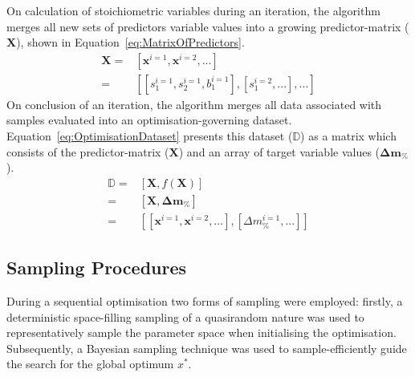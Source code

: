 On calculation of stoichiometric variables during an iteration, the
 algorithm merges all new sets of predictors variable values into a growing
 predictor-matrix (\(\mathbf{X}\)), shown in Equation~\ref{eq:MatrixOfPredictors}.
\begin{equation}\label{eq:MatrixOfPredictors}
    \begin{split}
        \mathbf{X}=&[\mathbf{x}^{i=1},\mathbf{x}^{i=2},...]\\
        =&[[s_{1}^{i=1},s_{2}^{i=1},b_{1}^{i=1}],[s_{1}^{i=2},...],...]
    \end{split}
\end{equation}
On conclusion of an iteration, the algorithm merges all data associated
 with samples evaluated into an optimisation-governing dataset.
Equation~\ref{eq:OptimisationDataset} presents this dataset (\(\mathbb{D}\))
 as a matrix which consists of the predictor-matrix (\(\mathbf{X}\)) and
 an array of target variable
 values (\(\mathbf{\Delta m_{\%}}\)).
\begin{equation}\label{eq:OptimisationDataset}
    \begin{split}
        \mathbb{D}=&[\mathbf{X},f(\mathbf{X})]\\
        =&[\mathbf{X},\mathbf{\Delta m_{\%}}]\\
        =&[[\mathbf{x}^{i=1},\mathbf{x}^{i=2},...],[\Delta m_{\%}^{i=1},...]]
    \end{split}
\end{equation}
\subsection{Sampling Procedures}
During a sequential optimisation two forms of sampling were employed: 
 firstly, a deterministic space-filling sampling of a quasirandom nature was
 used to representatively sample the parameter space when initialising the
 optimisation.
Subsequently, a Bayesian sampling technique was used to sample-efficiently
 guide the search for the global optimum \(x^{*}\).
